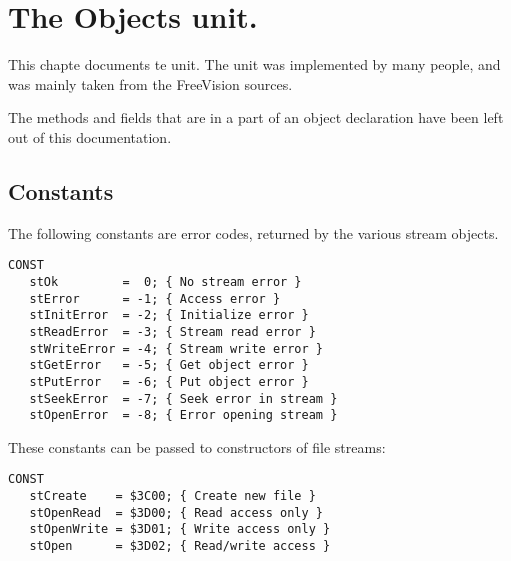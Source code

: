 %
%
%
%
%
\chapter{The Objects unit.}
This chapte documents te  unit. The unit was implemented by
many people, and was mainly taken from the FreeVision sources.

The methods and fields that are in a  part of an object
declaration have been left out of this documentation.

\section{Constants}
The following constants are error codes, returned by the various stream
objects.

\begin{verbatim}
CONST
   stOk         =  0; { No stream error }
   stError      = -1; { Access error }
   stInitError  = -2; { Initialize error }
   stReadError  = -3; { Stream read error }
   stWriteError = -4; { Stream write error }
   stGetError   = -5; { Get object error }
   stPutError   = -6; { Put object error }
   stSeekError  = -7; { Seek error in stream }
   stOpenError  = -8; { Error opening stream }
\end{verbatim}
These constants can be passed to constructors of file streams:
\begin{verbatim}
CONST
   stCreate    = $3C00; { Create new file }
   stOpenRead  = $3D00; { Read access only }
   stOpenWrite = $3D01; { Write access only }
   stOpen      = $3D02; { Read/write access }
\end{verbatim}

